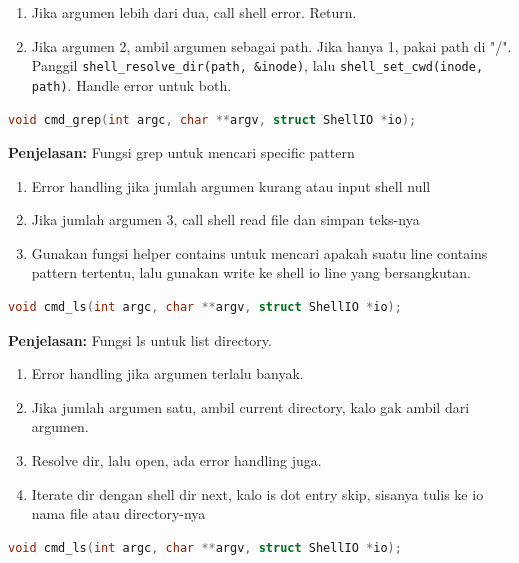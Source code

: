 \begin{enumerate}
    \item Jika argumen lebih dari dua, call shell error. Return.
    \item Jika argumen 2, ambil argumen sebagai path. Jika hanya 1, pakai path di "/". Panggil \texttt{shell\_resolve\_dir(path, \&inode)}, lalu \texttt{shell\_set\_cwd(inode, path)}. Handle error untuk both.
\end{enumerate}

\begin{lstlisting}[language=c]
    void cmd_grep(int argc, char **argv, struct ShellIO *io);
\end{lstlisting}

\textbf{Penjelasan:} Fungsi grep untuk mencari specific pattern

\begin{enumerate}
    \item Error handling jika jumlah argumen kurang atau input shell null
    \item Jika jumlah argumen 3, call shell read file dan simpan teks-nya
    \item Gunakan fungsi helper contains untuk mencari apakah suatu line contains pattern tertentu, lalu gunakan write ke shell io line yang bersangkutan.
\end{enumerate}

\begin{lstlisting}[language=c]
    void cmd_ls(int argc, char **argv, struct ShellIO *io);
\end{lstlisting}

\textbf{Penjelasan:} Fungsi ls untuk list directory.

\begin{enumerate}
    \item Error handling jika argumen terlalu banyak.
    \item Jika jumlah argumen satu, ambil current directory, kalo gak ambil dari argumen.
    \item Resolve dir, lalu open, ada error handling juga.
    \item Iterate dir dengan shell dir next, kalo is dot entry skip, sisanya tulis ke io nama file atau directory-nya
\end{enumerate}

\begin{lstlisting}[language=c]
    void cmd_ls(int argc, char **argv, struct ShellIO *io);
\end{lstlisting}

